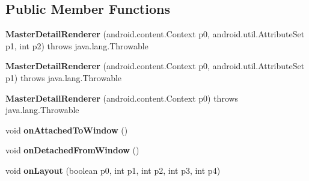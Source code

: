 \subsection*{Public Member Functions}
\begin{DoxyCompactItemize}
\item 
\hypertarget{classmd5282f1122c1313907b9bf274dd2c2f344_1_1MasterDetailRenderer_a5071b3e3f27123f74a3ad672d3b23268}{}{\bfseries Master\+Detail\+Renderer} (android.\+content.\+Context p0, android.\+util.\+Attribute\+Set p1, int p2)  throws java.\+lang.\+Throwable 	\label{classmd5282f1122c1313907b9bf274dd2c2f344_1_1MasterDetailRenderer_a5071b3e3f27123f74a3ad672d3b23268}

\item 
\hypertarget{classmd5282f1122c1313907b9bf274dd2c2f344_1_1MasterDetailRenderer_ae319b588f94d60bbad41a89a086cde59}{}{\bfseries Master\+Detail\+Renderer} (android.\+content.\+Context p0, android.\+util.\+Attribute\+Set p1)  throws java.\+lang.\+Throwable 	\label{classmd5282f1122c1313907b9bf274dd2c2f344_1_1MasterDetailRenderer_ae319b588f94d60bbad41a89a086cde59}

\item 
\hypertarget{classmd5282f1122c1313907b9bf274dd2c2f344_1_1MasterDetailRenderer_a4e776c007bfa662f9fbb9d1fecae1e54}{}{\bfseries Master\+Detail\+Renderer} (android.\+content.\+Context p0)  throws java.\+lang.\+Throwable 	\label{classmd5282f1122c1313907b9bf274dd2c2f344_1_1MasterDetailRenderer_a4e776c007bfa662f9fbb9d1fecae1e54}

\item 
\hypertarget{classmd5282f1122c1313907b9bf274dd2c2f344_1_1MasterDetailRenderer_a46aefa4a80b67550cf886a9d91dd431f}{}void {\bfseries on\+Attached\+To\+Window} ()\label{classmd5282f1122c1313907b9bf274dd2c2f344_1_1MasterDetailRenderer_a46aefa4a80b67550cf886a9d91dd431f}

\item 
\hypertarget{classmd5282f1122c1313907b9bf274dd2c2f344_1_1MasterDetailRenderer_a626b6529384abdd51a0bc5b780df535f}{}void {\bfseries on\+Detached\+From\+Window} ()\label{classmd5282f1122c1313907b9bf274dd2c2f344_1_1MasterDetailRenderer_a626b6529384abdd51a0bc5b780df535f}

\item 
\hypertarget{classmd5282f1122c1313907b9bf274dd2c2f344_1_1MasterDetailRenderer_ab3023fc348add4a9a118b5ddb87661d9}{}void {\bfseries on\+Layout} (boolean p0, int p1, int p2, int p3, int p4)\label{classmd5282f1122c1313907b9bf274dd2c2f344_1_1MasterDetailRenderer_ab3023fc348add4a9a118b5ddb87661d9}


\end{DoxyCompactItemize}
